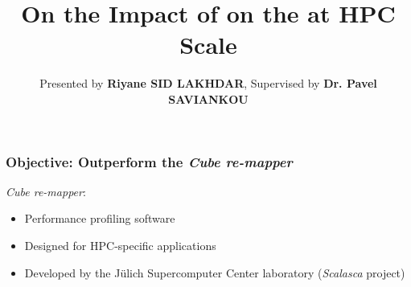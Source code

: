 \documentclass[slidestop,xcolor=dvipsnames, notes=hide]{beamer}
\title[On the Impact of \notationAIO\space on the \toolTargetSoftware\space at HPC Scale] %
{On the Impact of \notationAIO\space on the \toolTargetSoftware\space at HPC Scale}
\subtitle{Presented by \textbf{Riyane SID LAKHDAR}, Supervised by \textbf{Dr. Pavel SAVIANKOU}}
\author[SID LAKHDAR] %
{
}
\institute[JSC] %
{
	JSC \\
	Forschungszentrum Jülich GmbH
	Master of Computer Science at ENSIMAG/UGA Grenoble\\
	Specialization in Parallel Distributed Embedded Systems
}
\date[\today] %
\newcommand{\toolTargetSoftware}			{\emph{Cube re-mapper}}
\begin{document}
\maketitle















	\begin{frame}
		\frametitle{Objective: Outperform the \toolTargetSoftware}
		\toolTargetSoftware:
		\begin{itemize}
			\item Performance profiling software
            \item Designed for HPC-specific applications
            \item Developed by the Jülich Supercomputer Center laboratory (\emph{Scalasca} project)
        \end{itemize}
	\end{frame}
\end{document}
